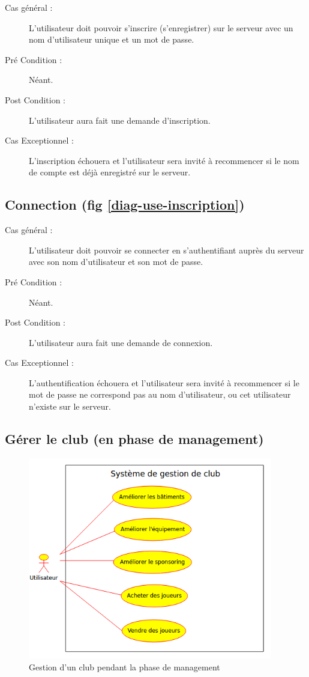 \documentclass[a4paper]{report}
\begin{document}
\begin{description}
    \item[Cas général  :] L'\gls{utilisateur} doit pouvoir s'inscrire (s'enregistrer) sur le \gls{serveur} avec un nom d'\gls{utilisateur} unique et un mot de passe.
    \item[Pré Condition  :] Néant.
    \item[Post Condition :] L'\gls{utilisateur} aura fait une demande d'inscription.
    \item[Cas Exceptionnel :] L'inscription échouera et l'\gls{utilisateur} sera invité à recommencer si le nom de compte est déjà enregistré sur le \gls{serveur}.
\end{description}

\subsection{Connection (fig \ref{diag-use-inscription})}
\begin{description}
    \item[Cas général :] L'\gls{utilisateur} doit pouvoir se connecter en s'authentifiant auprès du \gls{serveur} avec son nom d'\gls{utilisateur} et son mot de passe.
    \item[Pré Condition  :] Néant.
    \item[Post Condition :] L'\gls{utilisateur} aura fait une demande de connexion.
    \item[Cas Exceptionnel :] L'authentification échouera et l'\gls{utilisateur} sera invité à recommencer si le mot de passe ne correspond pas au nom d'\gls{utilisateur}, ou cet \gls{utilisateur} n'existe sur le \gls{serveur}.
\end{description}

\subsection{Gérer le \gls{club} (en phase de management)}

\begin{figure}[H]
    \begin{center}
        \includegraphics[height=250pt]{uml/mngClub.png}
        \caption{\label{diag-use-management} Gestion d'un \gls{club} pendant la phase de management}
    \end{center}
\end{figure}
\end{document}
